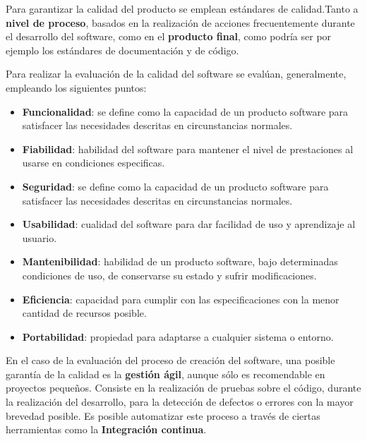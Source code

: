 Para garantizar la calidad del producto se emplean estándares de calidad.Tanto a\textbf{ nivel de proceso}, basados en la realización de acciones frecuentemente durante el desarrollo del software, como en el \textbf{producto final}, como podría ser por ejemplo los estándares de documentación y de código. 

Para realizar la evaluación de la calidad del software se evalúan, generalmente, empleando los siguientes puntos:
\begin{itemize}
	\item \textbf{Funcionalidad}: se define como la capacidad de un producto software para satisfacer las necesidades descritas en circunstancias normales.
	\item \textbf{Fiabilidad}: habilidad del software para mantener el nivel de prestaciones al usarse en condiciones especificas.
	\item \textbf{Seguridad}: se define como la capacidad de un producto software para satisfacer las necesidades descritas en circunstancias normales.
	\item \textbf{Usabilidad}: cualidad del software para dar facilidad de uso y aprendizaje al usuario.
	\item \textbf{Mantenibilidad}: habilidad de un producto software, bajo determinadas condiciones de uso, de conservarse su estado y sufrir modificaciones.
	\item \textbf{Eficiencia}: capacidad  para cumplir con las especificaciones con la menor cantidad de recursos posible.
	\item \textbf{Portabilidad}: propiedad para adaptarse a cualquier sistema o entorno.
\end{itemize}

En el caso de la evaluación del proceso de creación del software, una posible garantía de la calidad es la \textbf{gestión ágil}, aunque sólo es recomendable en proyectos pequeños. Consiste en la realización de pruebas sobre el código, durante la realización del desarrollo, para la detección de defectos o errores con la mayor brevedad posible. Es posible automatizar este proceso a través de ciertas herramientas como la \textbf{Integración continua}.

